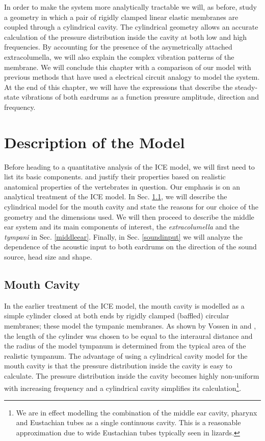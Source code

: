In order to make the system more analytically tractable we will, as before, study a geometry in which a pair of rigidly clamped
linear elastic membranes are coupled through a cylindrical cavity. The cylindrical geometry allows an accurate calculation of the 
pressure distribution inside the cavity at both low and high frequencies. By accounting for the presence of the asymetrically attached
extracolumella, we will also explain the complex vibration patterns of the membrane. We will conclude this chapter
with a comparison of our model with previous methods that have used a electrical circuit analogy to model the system. At the end of this chapter, we will
have the expressions that describe the steady-state vibrations of both eardrums as a function pressure amplitude, direction and frequency.

\section{Description of the Model}\label{description}
Before heading to a quantitative analysis of the ICE model, we will first need to list its basic components. 
and justify their properties based on realistic anatomical properties of the vertebrates in question. Our emphasis is on an analytical treatment
of the ICE model.
In Sec. \ref{subsecinnercavity}, we will describe the cylindrical model for the mouth cavity and state the reasons
for our choice of the geometry and the dimensions used. We will then proceed to describe the middle
ear system and its main components of interest, the \textit{extracolumella} and the \textit{tympani}
in Sec. \ref{middleear}. Finally, in Sec. \ref{soundinput} we will analyze the dependence of the acoustic input to both
eardrums on the direction of the sound source, head size and shape. 
\subsection{Mouth Cavity}\label{subsecinnercavity}
In the earlier treatment of the ICE model, the mouth cavity is modelled as a simple cylinder closed at 
both ends by rigidly clamped (baffled) circular membranes; these model the tympanic membranes. As shown 
by Vossen in \cite[p.~21]{vossenthesis} and \cite{vossenjasa}, the length of the cylinder was chosen to be equal to the interaural distance and the radius of the model tympanum is
determined from the typical area of the realistic tympanum. The advantage of using a cylindrical cavity model for the mouth cavity is that the pressure
distribution inside the cavity is easy to calculate. The pressure distribution inside the cavity becomes highly non-uniform 
with increasing frequency and a cylindrical cavity simplifies its calculation\footnote{We are in effect modelling the combination
of the middle ear cavity, pharynx and Eustachian tubes as a single continuous cavity. This is a reasonable approximation due to wide
Eustachian tubes typically seen in lizards.}.

